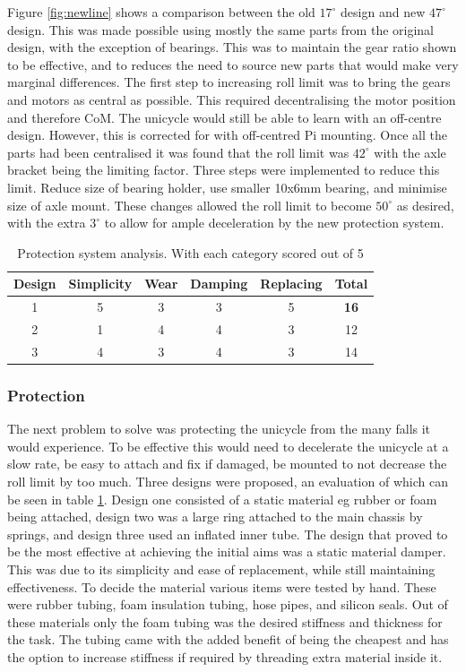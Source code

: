 \documentclass[twoside,twocolumn,12pt]{article}
\begin{document}
Figure \ref{fig:newline} shows a comparison between the old $17^{\circ}$ design and new $47^{\circ}$ design. This was made possible using mostly the same parts from the original design, with the exception of bearings. This was to maintain the gear ratio shown to be effective, and to reduces the need to source new parts that would make very marginal differences. 
\newline
The first step to increasing roll limit was to bring the gears and motors as central as possible. This required decentralising the motor position and therefore CoM. The unicycle would still be able to learn with an off-centre design. However, this is corrected for with off-centred Pi mounting. Once all the parts had been centralised it was found that the roll limit was $42^{\circ}$ with the axle bracket being the limiting factor. 
\newline
Three steps were implemented to reduce this limit. Reduce size of bearing holder, use smaller 10x6mm bearing, and minimise size of axle mount. These changes allowed the roll limit to become $50^{\circ}$ as desired, with the extra $3^{\circ}$ to allow for ample deceleration by the new protection system.  
\begin{table}[ht!]
\centering
\begin{tabular}{ c | c | c | c | c | c}
Design& Simplicity & Wear & Damping &Replacing & Total\\ 
\midrule
1&5 &3 &3&5&\textbf{16}\\
2&1& 4&4&3&12\\
3&4&3 &4&3&14\\
\end{tabular}
\caption{Protection system analysis. With each category scored out of 5}
\label{tab:pro}
\end{table}

\subsubsection{Protection}
The next problem to solve was protecting the unicycle from the many falls it would experience. To be effective this would need to decelerate the unicycle at a slow rate, be easy to attach and fix if damaged, be mounted to not decrease the roll limit by too much.
\newline
Three designs were proposed, an evaluation of which can be seen in table \ref{tab:pro}. Design one consisted of a static material eg rubber or foam being attached, design two was a large ring attached to the main chassis by springs, and design three used an inflated inner tube. The design that proved to be the most effective at achieving the initial aims was a static material damper. This was due to its simplicity and ease of replacement, while still maintaining effectiveness. To decide the material various items were tested by hand. These were rubber tubing, foam insulation tubing, hose pipes, and silicon seals. Out of these materials only the foam tubing was the desired stiffness and thickness for the task. The tubing came with the added benefit of being the cheapest and has the option to increase stiffness if required by threading extra material inside it.
\end{document}
